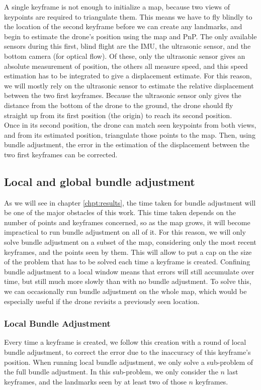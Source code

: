 A single keyframe is not enough to initialize a map, because two views of keypoints are required to triangulate them. This means we have to fly blindly to the location of the second keyframe before we can create any landmarks, and begin to estimate the drone's position using the map and PnP. The only available sensors during this first, blind flight are the IMU, the ultrasonic sensor, and the bottom camera (for optical flow). Of these, only the ultrasonic sensor gives an absolute measurement of position, the others all measure speed, and this speed estimation has to be integrated to give a displacement estimate. For this reason, we will mostly rely on the ultrasonic sensor to estimate the relative displacement between the two first keyframes. Because the ultrasonic sensor only gives the distance from the bottom of the drone to the ground, the drone should fly straight up from its first position (the origin) to reach its second position.\\

Once in its second position, the drone can match seen keypoints from both views, and from its estimated position, triangulate those points to the map. Then, using bundle adjustment, the error in the estimation of the displacement between the two first keyframes can be corrected.

\subsection{Local and global bundle adjustment}\label{sec:locglob}
As we will see in chapter \ref{chpt:results}, the time taken for bundle adjustment will be one of the major obstacles of this work. This time taken depends on the number of points and keyframes concerned, so as the map grows, it will become impractical to run bundle adjustment on all of it. For this reason, we will only solve bundle adjustment on a subset of the map, considering only the most recent keyframes, and the points seen by them. This will allow to put a cap on the size of the problem that has to be solved each time a keyframe is created. Confining bundle adjustment to a local window means that errors will still accumulate over time, but still much more slowly than with no bundle adjustment. To solve this, we can occasionally run bundle adjustment on the whole map, which would be especially useful if the drone revisits a previously seen location.

\subsubsection{Local Bundle Adjustment}
Every time a keyframe is created, we follow this creation with a round of local bundle adjustment, to correct the error due to the inaccuracy of this keyframe's position. When running local bundle adjustment, we only solve a sub-problem of the full bundle adjustment. In this sub-problem, we only consider the $n$ last keyframes, and the landmarks seen by at least two of those $n$ keyframes.\\

